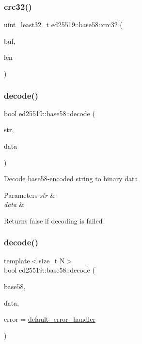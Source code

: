 \subsubsection{\texorpdfstring{crc32()}{crc32()}}
{\footnotesize\ttfamily uint\+\_\+least32\+\_\+t ed25519\+::base58\+::crc32 (\begin{DoxyParamCaption}\item[{unsigned char $\ast$}]{buf,  }\item[{size\+\_\+t}]{len }\end{DoxyParamCaption})}

\mbox{\label{namespaceed25519_1_1base58_ac8132589f5098b8de74d2dfb72f7bf65}} 
\subsubsection{\texorpdfstring{decode()}{decode()}\hspace{0.1cm}{\footnotesize\ttfamily [1/2]}}
{\footnotesize\ttfamily bool ed25519\+::base58\+::decode (\begin{DoxyParamCaption}\item[{const std\+::string \&}]{str,  }\item[{std\+::vector$<$ unsigned char $>$ \&}]{data }\end{DoxyParamCaption})}

Decode base58-\/encoded string to binary data 
\begin{DoxyParams}{Parameters}
{\em str} & \\
\hline
{\em data} & \\
\hline
\end{DoxyParams}
\begin{DoxyReturn}{Returns}
false if decoding is failed 
\end{DoxyReturn}
\mbox{\label{namespaceed25519_1_1base58_a97f34fe5ffdd0da677a4cef6be3a5a60}} 
\subsubsection{\texorpdfstring{decode()}{decode()}\hspace{0.1cm}{\footnotesize\ttfamily [2/2]}}
{\footnotesize\ttfamily template$<$size\+\_\+t N$>$ \\
bool ed25519\+::base58\+::decode (\begin{DoxyParamCaption}\item[{const std\+::string \&}]{base58,  }\item[{std\+::array$<$ unsigned char, N $>$ \&}]{data,  }\item[{const \mbox{\hyperlink{namespaceed25519_a6ba572942b3c18591fc869d52a6b16e6}{Error\+Handler}} \&}]{error = {\ttfamily \mbox{\hyperlink{namespaceed25519_a7c7bb6ed17541162959c33ed3e3b15fb}{default\+\_\+error\+\_\+handler}}} }\end{DoxyParamCaption})}

